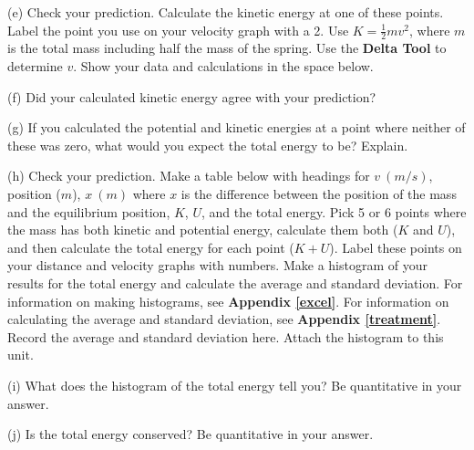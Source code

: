 \pagebreak[2]
(e) Check your prediction. Calculate the kinetic energy at one of these points.
Label the point you use on your velocity graph with a 2. Use 
$K = \frac{1}{2} mv^{2}$, where $m$ is the total mass including half the mass of 
the spring. Use the \textbf{Delta Tool} to determine $v$. Show your data and 
calculations in the space below.
\vspace{20mm}

(f) Did your calculated kinetic energy agree with your prediction?
\vspace{15mm}

(g) If you calculated the potential and kinetic energies at a point where 
neither of these was zero, what would you expect the total energy to be? 
Explain.
\vspace{20mm}

(h) Check your prediction. Make a table below with headings for $v~(m/s)$, 
position ($m$), $x~(m)$ where $x$ is the difference between the position
of the mass and the equilibrium position, $K$, $U$, and the total energy.
Pick 5 or 6 points where the mass has both kinetic and
potential energy, calculate them both ($K$ and $U$), and then calculate the 
total energy for each point ($K+U$). Label these points on your distance
and velocity graphs with numbers. 
Make a histogram of your results for the total energy and calculate the 
average and standard deviation.
For information on making histograms, see \textbf{Appendix \ref{excel}}. For information 
on calculating the average and standard deviation, see \textbf{Appendix \ref{treatment}}. 
Record the average and standard deviation here.
Attach the histogram to this unit.
\vspace{60mm}

(i) What does the histogram of the total energy tell you? Be quantitative in 
your answer.
\vspace{20mm}

(j) Is the total energy conserved?  Be quantitative in your answer.

